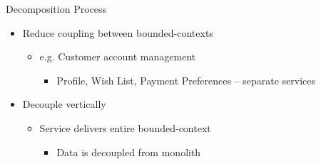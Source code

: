 \documentclass{slide}
\begin{document}
\begin{frame}{Decomposition Process}
\vspace{1pt}
{\huge
\begin{itemize}
    \item Reduce coupling between bounded-contexts
    \vspace{1mm}
    \begin{itemize}
        \LARGE\item e.g. Customer account management
        \begin{itemize}
            \Large\item Profile, Wish List, Payment Preferences -- separate services
        \end{itemize}
    \end{itemize}
    \vspace{3mm}
    \item Decouple vertically
    \vspace{1mm}
    \begin{itemize}
        \LARGE\item Service delivers entire bounded-context
        \begin{itemize}
            \Large\item Data is decoupled from monolith
        \end{itemize}
    \end{itemize}
\end{itemize}
}
\end{frame}
\end{document}
